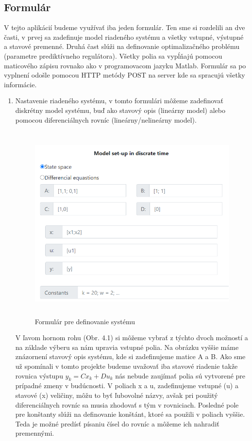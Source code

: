 \subsection{Formulár}
\label{subse:Formular}
V tejto aplikácií budeme využívať iba jeden formulár. Ten sme si rozdelili an dve časti, v prvej sa zadefinuje model riadeného systému a všetky vstupné, výstupné a stavové premenné. Druhá čast slúži na definovanie optimalizačného problému (parametre prediktívneho regulátora). Všetky polia sa vypĺňajú pomocou maticového zápisu rovnako ako v programovacom jazyku Matlab. Formulár sa po vyplnení odošle pomocou HTTP metódy POST na server kde sa spracujú všetky informácie. 
\begin{enumerate}
\item {Nastavenie riadeného systému, v tomto formulári môžeme zadefinovať diskrétny model systému, buď ako stavový opis (lineárny model) alebo pomocou diferenciálnych rovníc (lineárny/nelineárny model).
\begin{figure}[H]	
	\centering
	\includegraphics[width=13cm,height=10cm]{images/Model_setup}
	\caption{Formulár pre definovanie systému}
\end{figure}
V ľavom hornom rohu (Obr. 4.1) si môžeme vybrať z týchto dvoch možností a na základe výberu sa nám upravia vstupné polia. Na obrázku vyššie máme znázornení stavový opis systému, kde si zadefinujeme matice A a B. Ako sme už spomínali v tomto projekte budeme uvažovať iba stavové riadenie takže rovnica výstupu $y_{k} = Cx_{k} + Du_{k}$ nás nebude zaujímať polia sú vytvorené pre prípadné zmeny v budúcnosti. V poliach x a u, zadefinujeme vstupné (u) a stavové (x) veličiny, môžu to byť ľubovolné názvy, avšak pri použitý diferenciálnych rovníc sa musia zhodovať s tým v rovniciach. Posledné pole pre konštanty slúži na definovanie konštánt, ktoré sa použili v poliach vyššie. Teda je možné predísť písaniu čísel do rovníc a môžeme ich nahradiť premennými. 
}
\end{enumerate}
